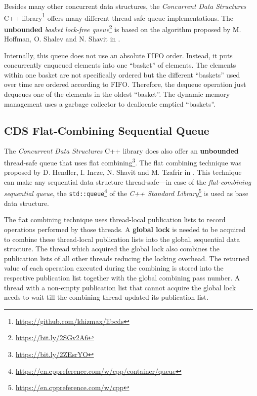 	Besides many other concurrent data structures, the \textit{Concurrent Data Structures} C++ library\footnote{\url{https://github.com/khizmax/libcds}} offers many different thread-safe queue implementations. The \textbf{unbounded} \emph{basket lock-free queue}\footnote{\url{https://bit.ly/2SGv2A6}} is based on the algorithm proposed by M. Hoffman, O. Shalev and N. Shavit in \cite{Hoffman:2007}.
	
	Internally, this queue does not use an absolute FIFO order. Instead, it puts concurrently enqueued elements into one ``basket'' of elements. The elements within one basket are not specifically ordered but the different ``baskets'' used over time are ordered according to FIFO. Therefore, the dequeue operation just dequeues one of the elements in the oldest ``basket''. The dynamic memory management uses a garbage collector to deallocate emptied ``baskets''.

\subsection[CDS FCQueue]{CDS Flat-Combining Sequential Queue} \label{subsec:cds-fc}

	The \textit{Concurrent Data Structures} C++ library does also offer an \textbf{unbounded} thread-safe queue that uses flat combining\footnote{\url{https://bit.ly/2ZEsrYO}}. The flat combining technique was proposed by D. Hendler, I. Incze, N. Shavit and M. Tzafrir in \cite{Hendler:2010}.  This technique can make any sequential data structure thread-safe---in case of the \emph{flat-combining sequential queue}, the \texttt{std::queue}\footnote{\url{https://en.cppreference.com/w/cpp/container/queue}} of the \textit{C++ Standard Library}\footnote{\url{https://en.cppreference.com/w/cpp}} is used as base data structure.
	
	The flat combining technique uses thread-local publication lists to record operations performed by those threads. A \textbf{global lock} is needed to be acquired to combine these thread-local publication lists into the global, sequential data structure. The thread which acquired the global lock also combines the publication lists of all other threads reducing the locking overhead. The returned value of each operation executed during the combining is stored into the respective publication list together with the global combining pass number. A thread with a non-empty publication list that cannot acquire the global lock needs to wait till the combining thread updated its publication list.

